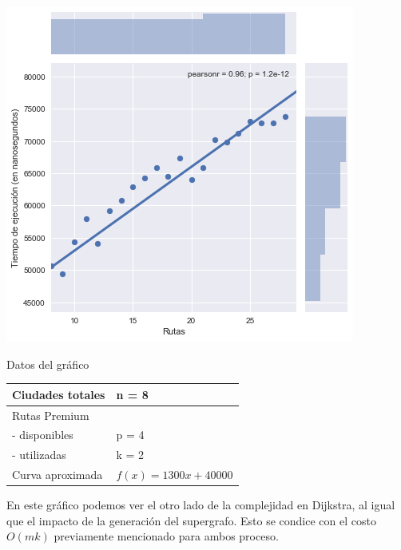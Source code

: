 \noindent
\begin{minipage}{0.55\textwidth}
	\hfill
	\includegraphics[scale=0.6]{imagenes/ej1-2-fib.png}
\end{minipage}
\hfill
\begin{minipage}{0.44\textwidth}
	\begin{center}
		Datos del gráfico

		\begin{tabular}{ | l l |}
			\hline
			Ciudades totales & n = 8 \\ \hline
			Rutas Premium & \\
			- disponibles & p = 4 \\
			- utilizadas & k = 2 \\ \hline
			Curva aproximada & $f(x) = 1300 x + 40000$ \\
			\hline
		\end{tabular}
	\end{center}
\end{minipage}

En este gráfico podemos ver el otro lado de la complejidad en Dijkstra, al igual que el impacto de la generación del supergrafo. Esto se condice con el costo $O(mk)$ previamente mencionado para ambos proceso.

